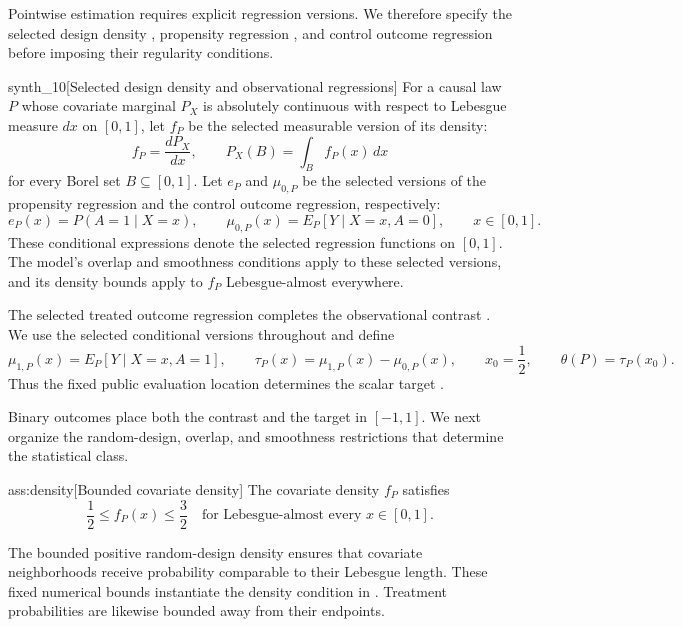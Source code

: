 Pointwise estimation requires explicit regression versions. We therefore specify the selected design density , propensity regression , and control outcome regression  before imposing their regularity conditions.

\begin{definitionv}{synth_10}[Selected design density and observational regressions]
For a causal law \(P\) whose covariate marginal \(P_X\) is absolutely continuous with respect to Lebesgue measure \(dx\) on \([0,1]\), let \(f_P\) be the selected measurable version of its density:
\[
f_P=\frac{dP_X}{dx},
\qquad
P_X(B)=\int_B f_P(x)\,dx
\]
for every Borel set \(B\subseteq[0,1]\). Let \(e_P\) and \(\mu_{0,P}\) be the selected versions of the propensity regression and the control outcome regression, respectively:
\[
e_P(x)=P(A=1\mid X=x),
\qquad
\mu_{0,P}(x)=E_P[Y\mid X=x,A=0],
\qquad x\in[0,1].
\]
These conditional expressions denote the selected regression functions on \([0,1]\). The model's overlap and smoothness conditions apply to these selected versions, and its density bounds apply to \(f_P\) Lebesgue-almost everywhere.
\end{definitionv}

The selected treated outcome regression  completes the observational contrast . We use the selected conditional versions throughout and define
\[
\mu_{1,P}(x)=E_P[Y\mid X=x,A=1],
\qquad
\tau_P(x)=\mu_{1,P}(x)-\mu_{0,P}(x),
\qquad
x_0=\frac12,
\qquad
\theta(P)=\tau_P(x_0).
\]
Thus the fixed public evaluation location  determines the scalar target .



Binary outcomes place both the contrast and the target in \([-1,1]\). We next organize the random-design, overlap, and smoothness restrictions that determine the statistical class.

\begin{assumptionv}{ass:density}[Bounded covariate density]
The covariate density \(f_P\) satisfies
\[
\frac12\le f_P(x)\le\frac32
\quad\text{for Lebesgue-almost every }x\in[0,1].
\]
\end{assumptionv}

The bounded positive random-design density ensures that covariate neighborhoods receive probability comparable to their Lebesgue length. These fixed numerical bounds instantiate the density condition in \citep[Theorem 1, footnote 6]{WagerAthey2018}. Treatment probabilities are likewise bounded away from their endpoints.

